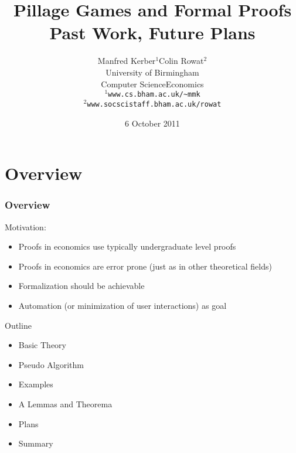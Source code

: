 \documentclass{beamer}
\def\mcolor#1#2{\rule{0ex}{0ex}\color{#1}#2\color{black}{}}
\begin{document}
\title{Pillage Games and Formal Proofs\\ Past Work, Future Plans}

\author[M.~Kerber, C.~Rowat]{\begin{tabular}{cc}Manfred Kerber$^1$ & Colin Rowat$^2$\\
\multicolumn{2}{c}{University of Birmingham}\\
Computer Science & Economics
\end{tabular}\rule[-5ex]{0ex}{5ex}
  $^1${\tt www.cs.bham.ac.uk/\~{}mmk}\\
  $^2${\tt www.socscistaff.bham.ac.uk/rowat}\\
}

\date{6 October 2011}

\begin{frame}
\titlepage
\end{frame}

\section{Overview}
\begin{frame}
\frametitle{Overview}
\mcolor{red}{Motivation:}
\begin{itemize}
\item Proofs in economics use typically undergraduate level proofs
\item Proofs in economics are error prone (just as in other theoretical fields)
\item Formalization should be achievable
\item Automation (or minimization of user interactions) as goal
\end{itemize}\pause

\mcolor{blue}{Outline}
\begin{itemize}
\item Basic Theory
\item Pseudo Algorithm
\item Examples
\item A Lemmas and Theorema
\item Plans
\item Summary
\end{itemize}
\end{frame}
\end{document}
